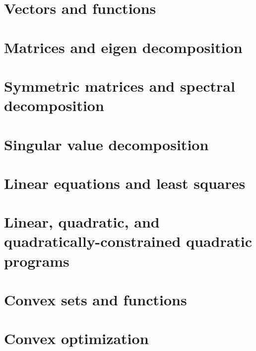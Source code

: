 \documentclass{tufte-book} %
\theoremstyle{definition}
\theoremstyle{remark}
\numberwithin{section}{chapter}
\numberwithin{equation}{chapter}
\numberwithin{figure}{chapter}
\begin{document}
\chapter{Vectors and functions}
\label{ch.vecFunc}




\chapter{Matrices and eigen decomposition}
\label{ch.matEig}



\chapter{Symmetric matrices and spectral decomposition}
\label{ch.symmMat}



\chapter{Singular value decomposition}
\label{ch.SVD}


\chapter{Linear equations and least squares}
\label{ch.linEqLS}


\chapter{Linear, quadratic, and quadratically-constrained quadratic programs}
\label{ch.linQuadGeom}


\chapter{Convex sets and functions}
\label{ch.convex}


\chapter{Convex optimization}
\label{ch.convex}


%
\end{document}
